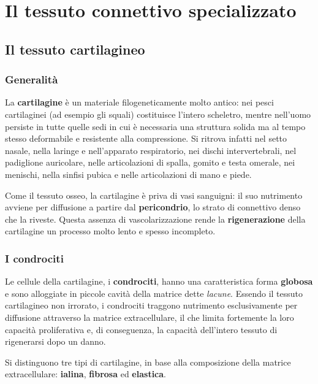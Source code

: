 \chapter{Il tessuto connettivo specializzato}

\section{Il tessuto cartilagineo}

\subsection{Generalità}

La \textbf{cartilagine} è un materiale filogeneticamente molto antico: nei
pesci cartilaginei (ad esempio gli squali) costituisce l'intero scheletro,
mentre nell'uomo persiste in tutte quelle sedi in cui è necessaria una
struttura solida ma al tempo stesso deformabile e resistente alla
compressione. Si ritrova infatti nel setto nasale, nella laringe e
nell'apparato respiratorio, nei dischi intervertebrali, nel padiglione
auricolare, nelle articolazioni di spalla, gomito e testa omerale, nei
menischi, nella sinfisi pubica e nelle articolazioni di mano e piede.

Come il tessuto osseo, la cartilagine è priva di vasi sanguigni: il suo
nutrimento avviene per diffusione a partire dal \textbf{pericondrio}, lo
strato di connettivo denso che la riveste. Questa assenza di
vascolarizzazione rende la \textbf{rigenerazione} della cartilagine un
processo molto lento e spesso incompleto.

\subsection{I condrociti}

Le cellule della cartilagine, i \textbf{condrociti}, hanno una caratteristica
forma \textbf{globosa} e sono alloggiate in piccole cavità della matrice dette
\textit{lacune}. Essendo il tessuto cartilagineo non
irrorato, i condrociti traggono nutrimento esclusivamente per diffusione
attraverso la matrice extracellulare, il che limita fortemente la loro
capacità proliferativa e, di conseguenza, la capacità dell'intero tessuto di
rigenerarsi dopo un danno.

Si distinguono tre tipi di cartilagine, in base alla composizione della
matrice extracellulare: \textbf{ialina}, \textbf{fibrosa} ed
\textbf{elastica}.

